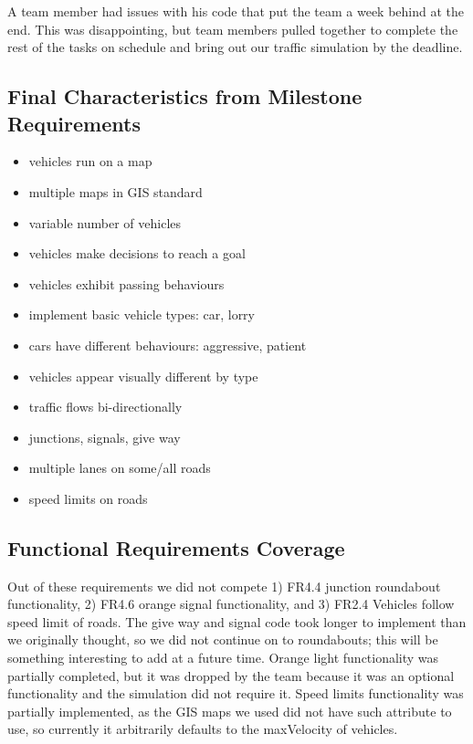\documentclass[11pt]{article}
\begin{document}
\begin{enumerate}
A team member had issues with his code that put the team a week behind at the end. This was disappointing, but team members pulled together to complete the rest of the tasks on schedule and bring out our traffic simulation by the deadline.
\\

\subsection{Final Characteristics from Milestone Requirements}
\begin{itemize}
\item vehicles run on a map
\item multiple maps in GIS standard
\item variable number of vehicles
\item vehicles make decisions to reach a goal
\item vehicles exhibit passing behaviours 
\item implement basic vehicle types: car, lorry
\item cars have different behaviours: aggressive, patient
\item vehicles appear visually different by type
\item traffic flows bi-directionally
\item junctions, signals, give way 
\item multiple lanes on some/all roads
\item speed limits on roads
\end{itemize}



\subsection{Functional Requirements Coverage}

Out of these requirements we did not compete 1) FR4.4 junction roundabout functionality, 2) FR4.6 orange signal functionality, and 3) FR2.4 Vehicles follow speed limit of roads. The give way and signal code took longer to implement than we originally thought, so we did not continue on to roundabouts; this will be something interesting to add at a future time. Orange light functionality was partially completed, but it was dropped by the team because it was an optional functionality and the simulation did not require it. Speed limits functionality was partially implemented, as the GIS maps we used did not have such attribute to use, so currently it arbitrarily defaults to the maxVelocity of vehicles.



\end{enumerate}
\end{document}
